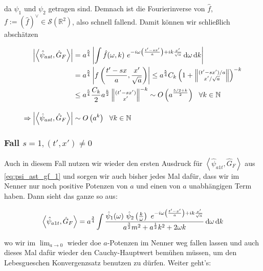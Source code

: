 da $\psi_1$ und $\psi_2$ getragen sind. Demnach ist die Fourierinverse von
$\hat f$, $f := (\hat f)^\vee \in \mathcal{S}(\mathbb{R}^2)$, also schnell
fallend. Damit können wir schließlich abschätzen

\begin{align}
    \left| \left< \hat\psi_{ast}, \hat G_F \right> \right|
    &=
    a^{\frac{5}{4}} \left|  \int \hat f(\omega, k)
    ~e^{-i \omega \left(\frac{t'-sx'}{a}\right) + ik \frac{x'}{\sqrt{a}}}
    \mathop{}\!\mathrm{d} \omega \mathop{}\!\mathrm{d} k
    \right|
    \nonumber \\
    &=
    a^{\frac{5}{4}} \left| f \left(\frac{t'-sx}{a}, \frac{x'}{\sqrt{a}}\right) \right|
    \leq
    a^{\frac{5}{4}} C_k\left(
    1 + \left\lVert \substack{(t'-sx')/a \\ x'/\sqrt{a}} \right\rVert
    \right)^{-k}
    \nonumber \\
    &\leq
    a^{\frac{5}{4}} \frac{C_k}{2} a^{\frac{k}{2}} \left\lVert
    \substack{(t'-sx') \\ x'} \right\rVert^{-k}
    \sim O\left(a^{\frac{5/2+k}{2}}\right) ~~ \forall k \in \mathbb{N}
    \nonumber \\[1em]
    \Rightarrow
     \left| \left< \hat\psi_{ast}, \hat G_F \right> \right|
     &\sim
     O\left(a^k\right) ~~ \forall k \in \mathbb{N}
\end{align}


\subsubsection*{Fall $s = 1, (t', x') \neq 0$}
Auch in diesem Fall nutzen wir wieder den ersten Ausdruck für
$\left< \hat\psi_{a1t}, \hat G_F \right>$ aus \eqref{eq:psi_ast_gf_1} und sorgen
wir auch bisher jedes Mal dafür, dass wir im Nenner nur noch positive Potenzen von
$a$ und einen von $a$ unabhängigen Term haben. Dann sieht das ganze so aus:

\begin{equation*}
    \left< \hat\psi_{a1t}, \hat G_F \right>
    =
    a^{\frac{3}{4}} \int \frac{\hat \psi_1(\omega)
    ~\hat\psi_2 \left(\frac{k}{\omega}\right)
    ~ e^{-i \omega \left(\frac{t'-x'}{a}\right) + i k \frac{x'}{\sqrt{a}}}
    }
    {
        a^{\frac{3}{2}} m^2 + a^{\frac{1}{2}} k^2 + 2 \omega k
    }
    \mathop{}\!\mathrm{d} \omega \mathop{}\!\mathrm{d} k
\end{equation*}

wo wir im $\lim_{a \rightarrow 0}$ wieder doe $a$-Potenzen im Nenner weg fallen lassen
und auch dieses Mal dafür wieder den Cauchy-Hauptwert bemühen müssen, um den
Lebesgueschen Konvergenzsatz benutzen zu dürfen.
Weiter geht's:

